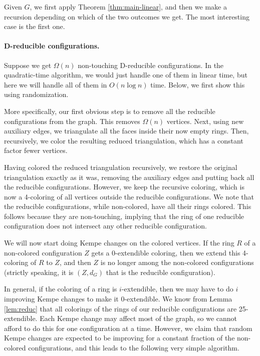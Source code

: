 \documentclass[10pt,a4paper]{article}
\begin{document}
Given $G$, we first apply Theorem \ref{thm:main-linear}, and then we make a recursion depending on which of the two outcomes we get. The most interesting case is the first one.


\paragraph{D-reducible configurations.}
Suppose we get $\Omega(n)$ non-touching D-reducible configurations.
In the quadratic-time algorithm, we would just handle one of them in linear time, but
here we will handle all of them in $O(n\log n)$ time. 
Below, we first show this using randomization. 

More specifically, our first obvious step is to remove all the reducible configurations from the graph. This removes $\Omega(n)$ vertices. Next, using new auxiliary edges, we triangulate all the faces inside their now empty rings. Then, recursively, we color the resulting reduced triangulation, which has a constant factor fewer vertices.

Having colored the reduced
triangulation recursively, we restore the original triangulation exactly as it was, removing the auxiliary edges and putting back all the reducible configurations. However, we keep the recursive coloring, which is now a 4-coloring of all vertices outside the reducible configurations. We note that the reducible configurations, while non-colored, have all their rings colored. This follows because they are non-touching, implying that the ring of one reducible configuration does not intersect any other reducible configuration.

We will now start doing Kempe changes on the colored vertices. If the ring $R$ of a non-colored configuration $Z$ gets a 0-extendible coloring, then we extend this 4-coloring of $R$ to $Z$, and then $Z$ is no longer among the non-colored configurations (strictly speaking, it is $(Z,d_G)$ that is the reducible configuration). 


In general, if the coloring of a ring is  $i$-extendible, then we may have to
do $i$ improving Kempe changes to make it $0$-extendible. We know from Lemma \ref{lem:reduc} that all colorings of the rings of our reducible configurations are 25-extendible. Each Kempe change may affect most of the graph, so we cannot afford to do this for one configuration at a time. 
However, we claim that random Kempe changes are expected to be improving for a constant fraction of 
the non-colored configurations, and this leads to the following very simple algorithm.
\end{document}
